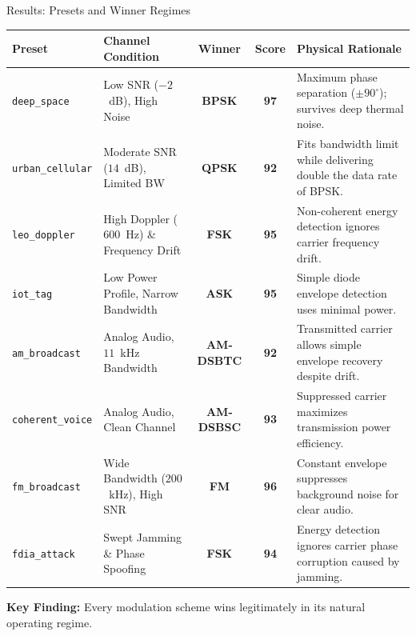 \documentclass[aspectratio=169, 10pt]{beamer}
\begin{document}
\begin{frame}{Results: Presets and Winner Regimes}
  \centering
  \scriptsize
  \begin{tabularx}{\textwidth}{p{2.2cm} p{3.8cm} c c p{4.6cm}}
    \toprule
    \textbf{Preset} & \textbf{Channel Condition} & \textbf{Winner} & \textbf{Score} & \textbf{Physical Rationale} \\
    \midrule
    \texttt{deep\_space} & Low SNR ($-2$~dB), High Noise & \textbf{BPSK} & \textbf{97} & Maximum phase separation ($\pm 90^\circ$); survives deep thermal noise. \\
    \addlinespace
    \texttt{urban\_cellular} & Moderate SNR ($14$~dB), Limited BW & \textbf{QPSK} & \textbf{92} & Fits bandwidth limit while delivering double the data rate of BPSK. \\
    \addlinespace
    \texttt{leo\_doppler} & High Doppler ($600$~Hz) \& Frequency Drift & \textbf{FSK} & \textbf{95} & Non-coherent energy detection ignores carrier frequency drift. \\
    \addlinespace
    \texttt{iot\_tag} & Low Power Profile, Narrow Bandwidth & \textbf{ASK} & \textbf{95} & Simple diode envelope detection uses minimal power. \\
    \addlinespace
    \texttt{am\_broadcast} & Analog Audio, $11$~kHz Bandwidth & \textbf{AM-DSBTC} & \textbf{92} & Transmitted carrier allows simple envelope recovery despite drift. \\
    \addlinespace
    \texttt{coherent\_voice} & Analog Audio, Clean Channel & \textbf{AM-DSBSC} & \textbf{93} & Suppressed carrier maximizes transmission power efficiency. \\
    \addlinespace
    \texttt{fm\_broadcast} & Wide Bandwidth ($200$~kHz), High SNR & \textbf{FM} & \textbf{96} & Constant envelope suppresses background noise for clear audio. \\
    \addlinespace
    \texttt{fdia\_attack} & Swept Jamming \& Phase Spoofing & \textbf{FSK} & \textbf{94} & Energy detection ignores carrier phase corruption caused by jamming. \\
    \bottomrule
  \end{tabularx}
  
  \vspace{0.25cm}
  \centering\small
  \textbf{Key Finding:} Every modulation scheme wins legitimately in its natural operating regime.
\end{frame}
\end{document}
